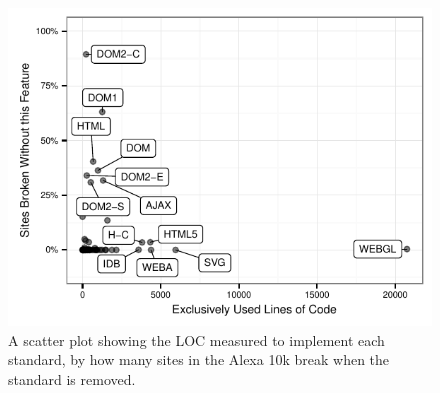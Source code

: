 \begin{figure}[ht]
  \centering
  \includegraphics[width=.5\textwidth]{figures/loc_breakrate.pdf}
  \caption{A scatter plot showing the LOC measured to implement each standard, by how many sites in the Alexa 10k break when the standard is removed.}
  \label{fig:loc-breakrate}
\end{figure}
